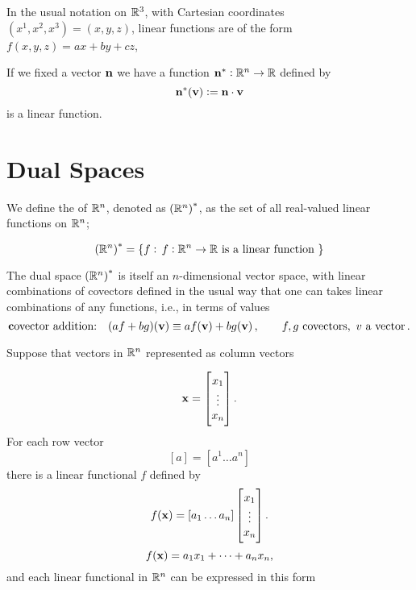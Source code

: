  \begin{exa}
In the usual notation on $\mathbb{R}^3$, with Cartesian coordinates $(x^1,x^2,x^3)=(x,y,z)$, linear functions are of the form $f(x,y,z)=ax+by+cz$, 
 \end{exa}

\begin{exa}

If we fixed a vector $\mathbf{ n}$ we have a function $\mathbf{ n}^*: \mathbb{R}^n\to \mathbb{R}$ defined by
\[\mathbf{ n}^*(\mathbf{ v}):=\mathbf{ n}\cdot \mathbf{ v}\]
 is a linear function.
 \end{exa}
 
 



 
 
\section{Dual Spaces}

\begin{df}
We define the   of $\mathbb{R}^n$,  denoted as $\left(\mathbb{R}^n\right)^*$, as the set  of  all real-valued linear functions on $\mathbb{R}^n$;

\[\left(\mathbb{R}^n\right)^*=\{f: \,f:\mathbb{R}^n\to \mathbb{R} \text{ is a linear function }\}\]
\end{df}




The dual space $\left(\mathbb{R}^n\right)^*$ is itself an $n$-dimensional vector space, with linear combinations of covectors defined in the usual way that one can takes linear combinations of any functions, i.e., in terms of values
$$
\text{\textbf covector addition:}\quad
(af+bg)(\mathbf{ v}) \equiv a f(\mathbf{ v})+ b g(\mathbf{ v})\,,
\qquad 
f, g\ \textrm{covectors},\ v\ \textrm{a\ vector} \,.
$$

\begin{thm}
Suppose that vectors in $\mathbb{R}^n$ represented as column vectors

\[\mathbf{ x} = \begin{bmatrix}x_1\\ \vdots\\ x_n\end{bmatrix}.\]
For each row vector 
\[[a]= [a^1 \dots a^n ]\] there is a linear functional $f$ defined by
\[f(\mathbf{ x}) = [a_1 \dots a_n] \begin{bmatrix}x_1\\ \vdots\\ x_n\end{bmatrix}.\]
\[f(\mathbf{ x}) = a_1x_1 + \cdots + a_n x_n,\]
and each linear functional   in $\mathbb{R}^n$ can be expressed in this form
% 
\end{thm}


